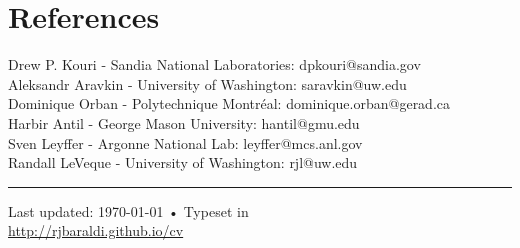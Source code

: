 \documentclass[10pt, a4paper]{article}
\begin{document}
\section*{References}
 Drew P. Kouri - Sandia National Laboratories: dpkouri@sandia.gov \\
 Aleksandr Aravkin - University of Washington: saravkin@uw.edu \\
 Dominique Orban - Polytechnique Montr\'eal: dominique.orban@gerad.ca \\
 Harbir Antil - George Mason University: hantil@gmu.edu\\
 Sven Leyffer - Argonne National Lab: leyffer@mcs.anl.gov \\
 Randall LeVeque - University of Washington: rjl@uw.edu \\
\hrule

\begin{center}
{\scriptsize  Last updated: \today\- •\-
Typeset in \href{http://nitens.org/taraborelli/cvtex}{
\XeTeX }\\
\href{https://rjbaraldi.github.io/assets/websitefiles/Personal/website\_tex/resume/cv.pdf}{http://rjbaraldi.github.io/cv}}
\end{center}
\end{document}
